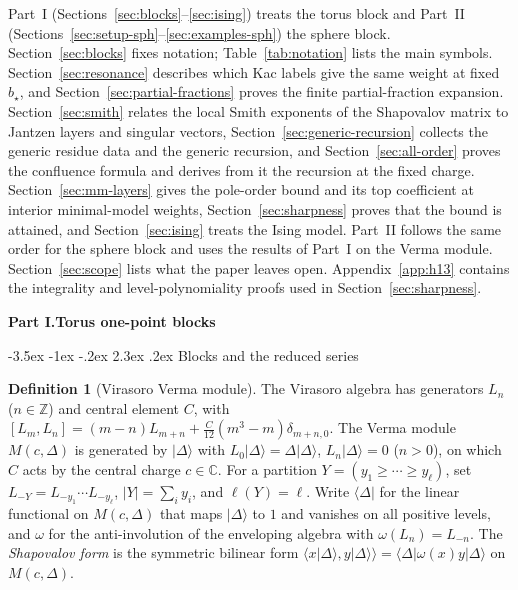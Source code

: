 \documentclass[twoside,10pt]{article}
\makeatletter
\numberwithin{equation}{section}
\theoremstyle{slbody}
\theoremstyle{definition}
\newtheorem{definition}[theorem]{Definition}
\theoremstyle{remark}
\renewcommand{\section}{%
  \@startsection{section}{1}{\z@}%
    {-3.5ex \@plus -1ex \@minus -.2ex}%
    {2.3ex \@plus .2ex}%
    {\normalfont\large\bfseries}}
\makeatother
\begin{document}
Part~I (Sections~\ref{sec:blocks}--\ref{sec:ising}) treats the torus block
and Part~II (Sections~\ref{sec:setup-sph}--\ref{sec:examples-sph}) the sphere
block.  Section~\ref{sec:blocks} fixes notation; Table~\ref{tab:notation}
lists the main symbols.  Section~\ref{sec:resonance} describes which Kac
labels give the same weight at fixed \(b_\star\), and
Section~\ref{sec:partial-fractions} proves the finite partial-fraction
expansion.  Section~\ref{sec:smith} relates the local Smith exponents of the
Shapovalov matrix to Jantzen layers and singular vectors,
Section~\ref{sec:generic-recursion} collects the generic residue data and the
generic recursion, and Section~\ref{sec:all-order} proves the confluence
formula and derives from it the recursion at the fixed charge.
Section~\ref{sec:mm-layers} gives the pole-order bound and its top
coefficient at interior minimal-model weights, Section~\ref{sec:sharpness}
proves that the bound is attained, and Section~\ref{sec:ising} treats the
Ising model.  Part~II follows the same order for the sphere block and uses
the results of Part~I on the Verma module.  Section~\ref{sec:scope} lists
what the paper leaves open.  Appendix~\ref{app:h13} contains the integrality
and level-polynomiality proofs used in Section~\ref{sec:sharpness}.

\begin{center}\large\bfseries Part I.\enspace Torus one-point blocks\end{center}

\section{Blocks and the reduced series}\label{sec:blocks}

\begin{definition}[Virasoro Verma module]\label{def:verma-module-B}
The Virasoro algebra has generators \(L_n\) (\(n\in\mathbb Z\)) and central
element \(C\), with
\([L_m,L_n]=(m-n)L_{m+n}+\frac{C}{12}(m^3-m)\delta_{m+n,0}\).
The Verma module \(M(c,\Delta)\) is generated by \(\lvert\Delta\rangle\) with
\(L_0\lvert\Delta\rangle=\Delta\lvert\Delta\rangle\),
\(L_n\lvert\Delta\rangle=0\) (\(n>0\)), on which \(C\) acts by the central
charge \(c\in\mathbb C\).
For a partition \(Y=(y_1\geq\cdots\geq y_\ell)\), set
\(L_{-Y}=L_{-y_1}\cdots L_{-y_\ell}\), \(|Y|=\sum_i y_i\), and
\(\ell(Y)=\ell\).  Write \(\langle\Delta|\) for the linear functional on
\(M(c,\Delta)\) that maps \(\lvert\Delta\rangle\) to \(1\) and vanishes on
all positive levels, and \(\omega\) for the anti-involution of the enveloping
algebra with \(\omega(L_n)=L_{-n}\).  The \emph{Shapovalov form} is the
symmetric bilinear form
\(\langle x\lvert\Delta\rangle,y\lvert\Delta\rangle\rangle
=\langle\Delta|\omega(x)y|\Delta\rangle\) on \(M(c,\Delta)\).
\end{definition}
\end{document}
